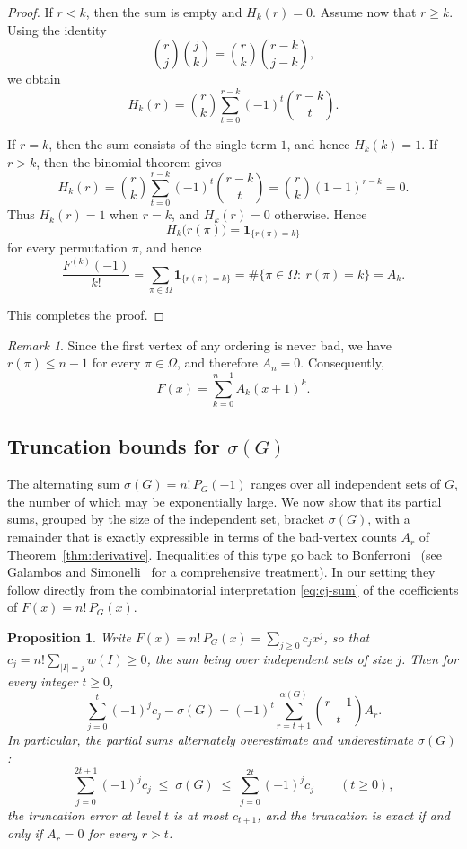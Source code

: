 \documentclass[11pt,a4paper]{article}
\numberwithin{equation}{section}
\theoremstyle{plain}
\newtheorem{proposition}[theorem]{Proposition}
\theoremstyle{definition}
\theoremstyle{remark}
\newtheorem{remark}[theorem]{Remark}
\begin{document}
\begin{proof}
If \(r<k\), then the sum is empty and \(H_k(r)=0\).
Assume now that \(r\ge k\).
Using the identity
\[
\binom{r}{j}\binom{j}{k}
=
\binom{r}{k}\binom{r-k}{j-k},
\]
we obtain
\[
H_k(r)
=
\binom{r}{k}
\sum_{t=0}^{r-k}
(-1)^t
\binom{r-k}{t}.
\]

If \(r=k\), then the sum consists of the single term \(1\), and hence
\(
H_k(k)=1.
\)
If \(r>k\), then the binomial theorem gives
\[
H_k(r)
=
\binom{r}{k}
\sum_{t=0}^{r-k}
(-1)^t\binom{r-k}{t}
=
\binom{r}{k}(1-1)^{r-k}
=
0.
\]
Thus \(H_k(r)=1\) when \(r=k\), and \(H_k(r)=0\) otherwise.
Hence
\[
H_k\!\bigl(r(\pi)\bigr)
=
\mathbf 1_{\{r(\pi)=k\}}
\]
for every permutation \(\pi\), and hence
\[
\frac{F^{(k)}(-1)}{k!}
=
\sum_{\pi\in\Omega}
\mathbf 1_{\{r(\pi)=k\}}
=
\#\{\pi\in\Omega:\ r(\pi)=k\}
=
A_k.
\]

This completes the proof.
\end{proof}

\begin{remark}
Since the first vertex of any ordering is never bad, we have
\(r(\pi)\le n-1\) for every \(\pi\in\Omega\), and therefore \(A_n=0\).
Consequently,
\[
F(x)
=
\sum_{k=0}^{n-1}
A_k(x+1)^k.
\]
\end{remark}

\subsection{Truncation bounds for \(\sigma(G)\)}
\label{subsec:bonferroni}

The alternating sum \(\sigma(G)=n!\,P_G(-1)\) ranges over all independent sets of \(G\), the number of which may be exponentially large. We now show that its partial sums, grouped by the size of the independent set, bracket \(\sigma(G)\), with a remainder
that is exactly expressible in terms of the bad-vertex counts \(A_r\) of Theorem~\ref{thm:derivative}. Inequalities of this type go back to Bonferroni~\cite{bonferroni1936} (see Galambos and
Simonelli~\cite{galambos1996bonferroni} for a comprehensive treatment). In our setting they follow directly from the combinatorial interpretation \eqref{eq:cj-sum} of the coefficients of \(F(x)=n!\,P_G(x)\).

\begin{proposition}\label{prop:bonferroni}
Write \(F(x)=n!\,P_G(x)=\sum_{j\ge 0}c_j x^j\), so that
\(c_j=n!\sum_{|I|=j} w(I)\ge 0\), the sum being over independent sets of size \(j\).
Then for every integer \(t\ge 0\),
\[
\sum_{j=0}^{t}(-1)^j c_j-\sigma(G)
=
(-1)^t\sum_{r=t+1}^{\alpha(G)}\binom{r-1}{t}A_r.
\]
In particular, the partial sums alternately overestimate and underestimate
\(\sigma(G)\):
\[
\sum_{j=0}^{2t+1}(-1)^j c_j
\;\le\;
\sigma(G)
\;\le\;
\sum_{j=0}^{2t}(-1)^j c_j
\qquad(t\ge 0),
\]
the truncation error at level \(t\) is at most \(c_{t+1}\), and the truncation is
exact if and only if \(A_r=0\) for every \(r>t\).
\end{proposition}
\end{document}

